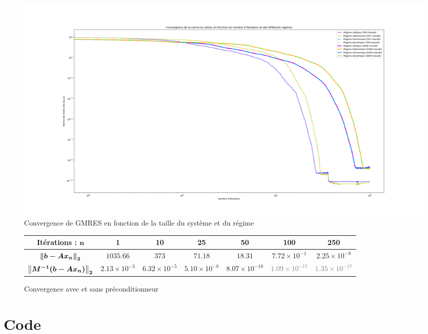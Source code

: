 \documentclass{article}[11pt]
\begin{document}
\begin{figure}[H]
	\centering
	\includegraphics[width=.8\textwidth]{res/plots/regimes.png}
	\caption{Convergence de GMRES en fonction de la taille du système et du régime\label{fig:regimes}}
\end{figure}
\begin{center}
\begin{figure}[H]
\begin{tabular}{|c|c|c|c|c|c|c|}
	\hline
		\textbf{Itérations : $\boldsymbol{n}$} & 1 & 10 & 25 & 50 & 100 & 250 \\
	\hline
		$\boldsymbol{\left\lVert b-Ax_n\right\rVert_2}$ & $1035.66$ & $373$ & $71.18$ &$18.31$ &$7.72\times 10^{-1}$ &$2.25\times 10^{-9}$ \\
	\hline
		$\boldsymbol{\left\lVert M^{-1}(b-Ax_n)\right\rVert_2}$ & $2.13\times 10^{-3}$ & $6.32\times 10^{-5}$ &$5.10\times 10^{-8}$ &$8.07\times 10^{-18}$ &\textcolor{grey}{$1.09\times 10^{-17}$} &\textcolor{grey}{$1.35\times 10^{-17}$} \\
	\hline
\end{tabular}
\caption{Convergence avec et sans préconditionneur}
\label{tab:conv}
\end{figure}
\end{center}

\section{Code}
\label{sec:code}
\end{document}
